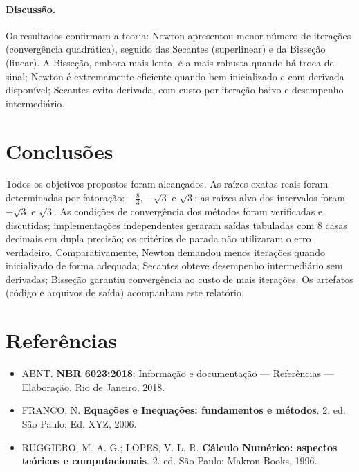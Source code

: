 \documentclass[12pt,a4paper]{article}
\begin{document}
\paragraph{Discussão.}
Os resultados confirmam a teoria: Newton apresentou menor número de iterações (convergência quadrática), seguido das Secantes
(superlinear) e da Bisseção (linear). A Bisseção, embora mais lenta, é a mais robusta quando há troca de sinal;
Newton é extremamente eficiente quando bem-inicializado e com derivada disponível; Secantes evita derivada, com custo por iteração
baixo e desempenho intermediário.

\section{Conclusões}
Todos os objetivos propostos foram alcançados.
As raízes exatas reais foram determinadas por fatoração: $-\tfrac{8}{3}$, $-\sqrt{3}$ e $\sqrt{3}$; as raízes-alvo dos intervalos
foram $-\sqrt{3}$ e $\sqrt{3}$.
As condições de convergência dos métodos foram verificadas e discutidas; implementações independentes geraram saídas tabuladas
com 8 casas decimais em dupla precisão; os critérios de parada não utilizaram o erro verdadeiro.
Comparativamente, Newton demandou menos iterações quando inicializado de forma adequada; Secantes obteve desempenho intermediário
sem derivadas; Bisseção garantiu convergência ao custo de mais iterações.
Os artefatos (código e arquivos de saída) acompanham este relatório.

\section*{Referências}
\begin{itemize}\itemsep0.3em
  \item ABNT. \textbf{NBR 6023:2018}: Informação e documentação — Referências — Elaboração. Rio de Janeiro, 2018.
  \item FRANCO, N. \textbf{Equações e Inequações: fundamentos e métodos}. 2. ed. São Paulo: Ed. XYZ, 2006.
  \item RUGGIERO, M. A. G.; LOPES, V. L. R. \textbf{Cálculo Numérico: aspectos teóricos e computacionais}. 2. ed. São Paulo: Makron Books, 1996.
\end{itemize}
\end{document}
